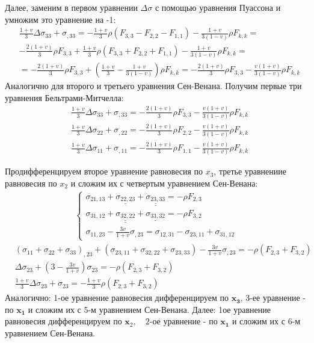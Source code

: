 Далее, заменим в первом уравнении $\Delta \sigma$ с помощью уравнения Пуассона и умножим это уравнение на -1:
$$
\begin{aligned}
& \frac{1+v}{3} \Delta \sigma_{33}+\sigma_{,33}=-\frac{1+v}{3} \rho\left(F_{3,3}-F_{2,2}-F_{1,1}\right)-\frac{1+v}{3(1-v)} \rho F_{k, k}=\\
&-\frac{2(1+v)}{3} \rho F_{3,3}+\frac{1+v}{3} \rho\left(F_{3,3}+F_{2,2}+F_{1,1}\right)-\frac{1+v}{3(1-v)} \rho F_{k, k}= \\
& =-\frac{2(1+v)}{3} \rho F_{3,3}+\left(\frac{1+v}{3}-\frac{1+v}{3(1-v)}\right) \rho F_{k, k}=-\frac{2(1+v)}{3} \rho F_{3,3}-\frac{v(1+v)}{3(1-v)} \rho F_{k, k}
\end{aligned} $$
Аналогично для второго и третьего уравнения Сен-Венана. Получим первые три уравнения Бельтрами-Митчелла:
$$
\begin{aligned}
& \frac{1+v}{3} \Delta \sigma_{33}+\sigma_{,33}=-\frac{2(1+v)}{3} \rho F_{3,3}-\frac{v(1+v)}{3(1-v)} \rho F_{k, k} \\
& \frac{1+v}{3} \Delta \sigma_{22}+\sigma_{, 22}=-\frac{2(1+v)}{3} \rho F_{2,2}-\frac{v(1+v)}{3(1-v)} \rho F_{k, k}\\
& \frac{1+v}{3} \Delta \sigma_{11}+\sigma_{, 11}=-\frac{2(1+v)}{3} \rho F_{1,1}-\frac{v(1+v)}{3(1-v)} \rho F_{k, k}
\end{aligned}
$$

Продифференцируем второе уравнение равновесия по $x_3$, третье уравнениие равновесия по $x_2$ и сложим их с четвертым уравнением Сен-Венана:
$$
\begin{aligned}
\left\{\begin{array}{l}
 \sigma_{2 1, 13}+\underline{\sigma_{22,23}}+\underline{\underline{\sigma_{23,33}}}=-\rho F_{2,3} \\
\sigma_{31,12}+\underline{\underline{\sigma_{32,22}}}+\underline{\sigma_{33,32}}=-\rho F_{3,2} \\
\sigma_{11,23}-\frac{3 v}{1+v} \sigma_{, 23}=\sigma_{12,31}-\sigma_{23,11}+\sigma_{31,12}
\end{array}\right.
\end{aligned}
$$
$$
\begin{aligned}
& \left(\sigma_{11}+\sigma_{22}+\sigma_{33}\right)_{, 23}+\left(\sigma_{23,11}+\sigma_{32,22}+\sigma_{23,33}\right)-\frac{3 v}{1+v} \sigma_{, 23}=-\rho\left(F_{2,3}+F_{3,2}\right) \\
& \Delta \sigma_{23}+\left(3-\frac{3 v}{1+v}\right) \sigma_{23}=-\rho\left(F_{2,3}+F_{3,2}\right) \quad \\
&\frac{1+v}{3} \Delta \sigma_{23}+\sigma_{23}=-\frac{1+v}{3} \rho\left(F_{2,3}+F_{3,2}\right)
\end{aligned}
$$
Аналогично: 1-ое уравнение равновесия дифференцируем по $\boldsymbol{x}_{\mathbf{3}}$, 3-ее уравнение - по $\boldsymbol{x}_{\mathbf{1}}$ и сложим их с 5-м уравнением Сен-Венана. Далее: 1ое уравнение равновесия дифференцируем по $\boldsymbol{x}_2,\quad 2$-ое уравнение - по $\boldsymbol{x}_{\mathbf{1}}$ и сложим их с 6-м уравнением Сен-Венана.


